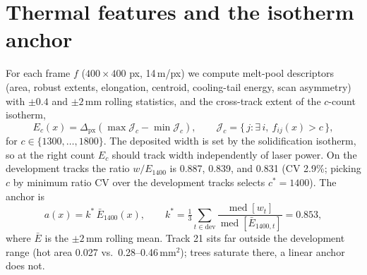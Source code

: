 \documentclass[10pt]{article}
\begin{document}
\section{Thermal features and the isotherm anchor}
For each frame $f$ ($400 \times 400$ px, 14\,\textmu m/px) we compute
melt-pool descriptors (area, robust extents, elongation, centroid,
cooling-tail energy, scan asymmetry) with $\pm 0.4$ and $\pm 2$\,mm rolling
statistics, and the cross-track extent of the $c$-count isotherm,
\begin{equation}
E_c(x) = \Delta_{\mathrm{px}}\left(\max \mathcal{J}_c - \min \mathcal{J}_c\right),
\qquad
\mathcal{J}_c = \{\, j : \exists\, i,\ f_{ij}(x) > c \,\},
\end{equation}
for $c \in \{1300, \ldots, 1800\}$. The deposited width is set by the
solidification isotherm, so at the right count $E_c$ should track width
independently of laser power. On the development tracks the ratio
$w/E_{1400}$ is 0.887, 0.839, and 0.831 (CV 2.9\%; picking $c$ by minimum
ratio CV over the development tracks selects $c^{*} = 1400$). The anchor is
\begin{equation}
a(x) = k^{*}\, \bar{E}_{1400}(x), \qquad
k^{*} = \tfrac{1}{3} \sum_{t \in \mathrm{dev}}
\frac{\operatorname{med}[w_t]}{\operatorname{med}[\bar{E}_{1400,t}]} = 0.853,
\end{equation}
where $\bar{E}$ is the $\pm 2$\,mm rolling mean. Track 21 sits far outside
the development range (hot area 0.027 vs.\ 0.28--0.46\,mm$^2$); trees
saturate there, a linear anchor does not.
\end{document}
